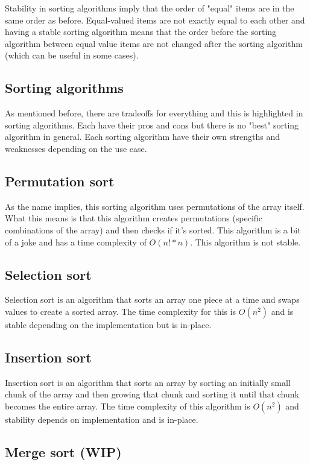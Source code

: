 \documentclass[11pt,a4paper,english]{report}
\begin{document}
Stability in sorting algorithms imply that the order of "equal" items are in the same order as before. Equal-valued items are not exactly equal to each other and having a stable sorting algorithm means that the order before the sorting algorithm between equal value items are not changed after the sorting algorithm (which can be useful in some cases).

\subsection{Sorting algorithms}

As mentioned before, there are tradeoffs for everything and this is highlighted in sorting algorithms. Each have their pros and cons but there is no "best" sorting algorithm in general. Each sorting algorithm have their own strengths and weaknesses depending on the use case.

\subsection{Permutation sort}

As the name implies, this sorting algorithm uses permutations of the array itself. What this means is that this algorithm creates permutations (specific combinations of the array) and then checks if it's sorted. This algorithm is a bit of a joke and has a time complexity of $O(n! * n)$. This algorithm is not stable.

\subsection{Selection sort}

Selection sort is an algorithm that sorts an array one piece at a time and swaps values to create a sorted array. The time complexity for this is $O(n^2)$ and is stable depending on the implementation but is in-place.

\subsection{Insertion sort}

Insertion sort is an algorithm that sorts an array by sorting an initially small chunk of the array and then growing that chunk and sorting it until that chunk becomes the entire array. The time complexity of this algorithm is $O(n^2)$ and stability depends on implementation and is in-place.

\subsection{Merge sort (WIP)}
\end{document}
